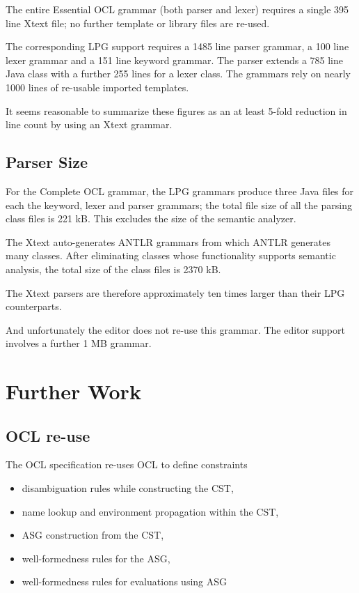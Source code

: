 \documentclass[runningheads,a4paper]{llncs}
\begin{document}
The entire Essential OCL grammar (both parser and lexer) requires a single 395 line Xtext file; no further template or library files are re-used.

The corresponding LPG support requires a 1485 line parser grammar, a 100 line lexer grammar and a 151 line keyword grammar. The parser extends a 785 line Java class with a further 255 lines for a lexer class. The grammars rely on nearly 1000 lines of re-usable imported templates.

It seems reasonable to summarize these figures as an at least 5-fold reduction in line count by using an Xtext grammar.

\subsection{Parser Size}

For the Complete OCL grammar, the LPG grammars produce three Java files for each the keyword, lexer and parser grammars; the total file size of all the parsing class files is 221 kB. This excludes the size of the semantic analyzer.

The Xtext auto-generates ANTLR grammars from which ANTLR generates many classes. After eliminating classes whose functionality supports semantic analysis, the total size of the class files is 2370 kB.

The Xtext parsers are therefore approximately ten times larger than their LPG counterparts.

And unfortunately the editor does not re-use this grammar. The editor support involves a further 1 MB grammar.

\section{Further Work}

\subsection{OCL re-use}

The OCL specification re-uses OCL to define constraints
\begin{itemize}
\item disambiguation rules while constructing the CST, 
\item name lookup and environment propagation within the CST, 
\item ASG construction from the CST, 
\item well-formedness rules for the ASG, 
\item well-formedness rules for evaluations using ASG
\end{itemize}
\end{document}
